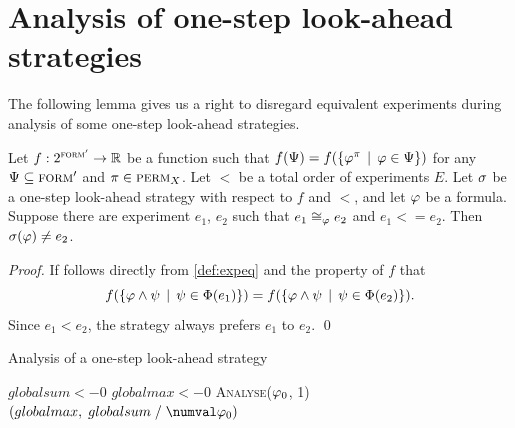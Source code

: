 \section{Analysis of one-step look-ahead strategies}

The following lemma gives us a right to disregard equivalent experiments
  during analysis of some one-step look-ahead strategies.

\begin{lemma}
Let $f: 2^{\textsc{form}'} ->\mathbb{R}$ be a function such that
  $f(\Psi) = f(\{\varphi^\pi \:\:|\:\: \varphi\in\Psi\})$ for any
  $\Psi\subseteq{\textsc{form}'}$ and $\pi\in\textsc{perm}_X$.
Let $<$ be a total order of experiments $E$.
Let $\sigma$ be a one-step look-ahead strategy with respect to $f$ and $<$, and
let $\varphi$ be a formula.
Suppose there are experiment $e_1$, $e_2$ such that $e_1\cong_{\varphi}e_2$ and $e_1<=e_2$.
Then $\sigma(\varphi) \not= e_2$.
\end{lemma}

\begin{proof}
If follows directly from \autoref{def:expeq} and the property of $f$ that
\[f(\{\varphi\wedge\psi\:\:|\:\: \psi\in\Phi(e_1)\}) =
 f(\{\varphi\wedge\psi\:\:|\:\: \psi\in\Phi(e_2)\}).\]
Since $e_1 < e_2$, the strategy always prefers $e_1$ to $e_2$. \qed
\end{proof}

\vspace{-5mm}
\begin{algorithm}[ht]
\caption{Analysis of a one-step look-ahead strategy}
\label{alg:stganalysis}
\DontPrintSemicolon
{}
$globalsum <- 0$\;
$globalmax <- 0$\;
\textsc{Analyse}($\varphi_0$, 1)\;
\Return$ (globalmax,\; globalsum \;/\; \numval\init)$\;\medskip
\setcounter{AlgoLine}{0}
\end{algorithm}

